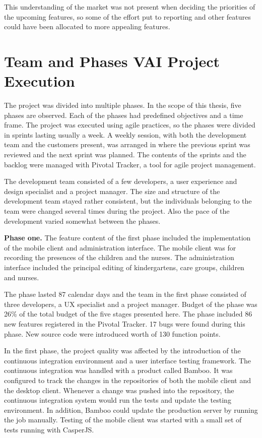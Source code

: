 This understanding of the market was not present when deciding the priorities of the upcoming features, so some of the effort put to reporting and other features could have been allocated to more appealing features.

 \section{Team and Phases VAI Project Execution}

The project was divided into multiple phases. In the scope of this thesis, five phases are observed. Each of the phases had predefined objectives and a time frame. The project was executed using agile practices, so the phases were divided in sprints lasting usually a week. A weekly session, with both the development team and the customers present, was arranged in where the previous sprint was reviewed and the next sprint was planned. The contents of the sprints and the backlog were managed with Pivotal Tracker, a tool for agile project management.

The development team consisted of a few developers, a user experience and design specialist and a project manager. The size and structure of the development team stayed rather consistent, but the individuals belonging to the team were changed several times during the project. Also the pace of the development varied somewhat between the phases.

\textbf{Phase one.} The feature content of the first phase included the implementation of the mobile client and administration interface. The mobile client was for recording the presences of the children and the nurses. The administration interface included the principal editing of kindergartens, care groups, children and nurses.

The phase lasted 87 calendar days and the team in the first phase consisted of three developers, a UX specialist and a project manager. Budget of the phase was 26\% of the total budget of the five stages presented here. The phase included 86 new features registered in the Pivotal Tracker. 17 bugs were found during this phase. New source code were introduced worth of 130 function points.

In the first phase, the project quality was affected by the introduction of the continuous integration environment and a user interface testing framework. 
The continuous integration was handled with a product called Bamboo. It was configured to track the changes in the repositories of both the mobile client and the desktop client. Whenever a change was pushed into the repository, the continuous integration system would run the tests and update the testing environment. In addition, Bamboo could update the production server by running the job manually. Testing of the mobile client was started with a small set of tests running with CasperJS.

